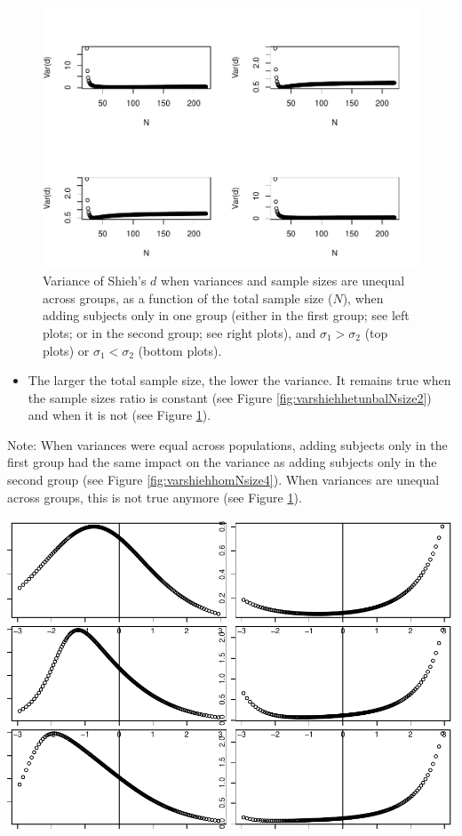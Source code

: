 \documentclass[
  english,
  man,mask]{apa6}
\providecommand{\tightlist}{%
  \setlength{\itemsep}{0pt}\setlength{\parskip}{0pt}}
\begin{document}
\begin{figure}
\centering
\includegraphics{SupMat1_files/figure-latex/varshiehhetunbalNsize4-1.pdf}
\caption{\label{fig:varshiehhetunbalNsize4}Variance of Shieh's \(d\) when variances and sample sizes are unequal across groups, as a function of the total sample size (\(N\)), when adding subjects only in one group (either in the first group; see left plots; or in the second group; see right plots), and \(\sigma_1 > \sigma_2\) (top plots) or \(\sigma_1 < \sigma_2\) (bottom plots).}
\end{figure}

\begin{itemize}
\tightlist
\item
  The larger the total sample size, the lower the variance. It remains true when the sample sizes ratio is constant (see Figure \ref{fig:varshiehhetunbalNsize2}) and when it is not (see Figure \ref{fig:varshiehhetunbalNsize4}).
\end{itemize}

Note: When variances were equal across populations, adding subjects only in the first group had the same impact on the variance as adding subjects only in the second group (see Figure \ref{fig:varshiehhomNsize4}). When variances are unequal across groups, this is not true anymore (see Figure \ref{fig:varshiehhetunbalNsize4}).

\includegraphics{SupMat1_files/figure-latex/varshiehhetunbaldfandvar-1.pdf}
\end{document}
